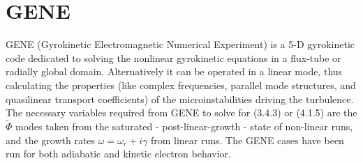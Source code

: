 \documentclass[12pt]{article}
\numberwithin{equation}{subsection}
\begin{document}
\section{GENE}
   \quad GENE (Gyrokinetic Electromagnetic Numerical Experiment) is a 5-D gyrokinetic code dedicated to solving the nonlinear gyrokinetic equations
in a flux-tube or radially global domain. Alternatively it can be operated in a linear mode, thus calculating the properties (like complex frequencies,
parallel mode structures, and quasilinear transport coefficients) of the microinstabilities driving the turbulence.\cite{GENE} The necessary variables
required from GENE to solve for (3.4.3) or (4.1.5) are the $\widetilde{\Phi}$ modes taken from the saturated - post-linear-growth - state of non-linear
runs, and the growth rates $\omega = \omega_r + i\gamma$ from linear runs. The GENE cases have been run for both adiabatic and kinetic electron behavior.
\end{document}
